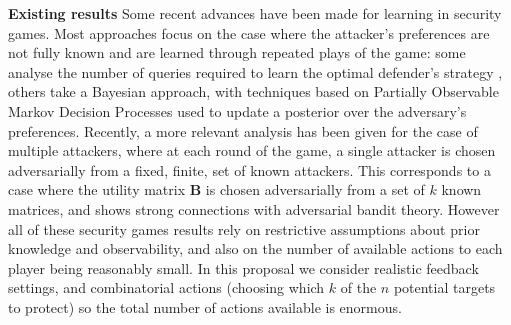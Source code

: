 




\textbf{Existing results}
Some recent advances have been made for learning in security games. Most approaches focus on the case where the attacker's preferences are not fully known and are learned through repeated plays of the game: some analyse the number of queries required to learn the optimal defender's strategy \cite{blum2014learning, letchford2009learning}, others take a Bayesian approach, with techniques based on Partially Observable Markov Decision Processes used to update a posterior over the adversary's preferences\cite{Marecki12PR, qian2014online}. 
Recently, a more relevant analysis has been given\cite{Balcan15CR} for the case of multiple attackers, where at each round of the game, a single attacker is chosen adversarially from a fixed, finite, set of known attackers. This corresponds to a case where the utility matrix $\boldsymbol B$ is chosen adversarially from a set of $k$ known matrices, and shows strong connections with adversarial bandit theory.  However all of these security games results rely on restrictive assumptions about prior knowledge and observability, and also on the number of available actions to each player being reasonably small.  In this proposal we consider realistic feedback settings, and combinatorial actions (choosing which $k$ of the $n$ potential targets to protect) so the total number of actions available is enormous. 

